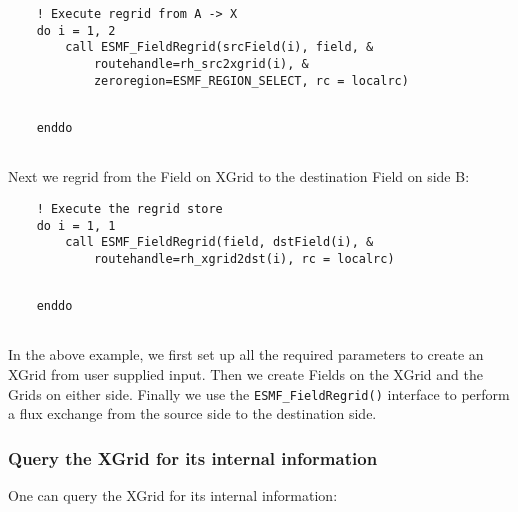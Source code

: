  \begin{verbatim}
    ! Execute regrid from A -> X
    do i = 1, 2
        call ESMF_FieldRegrid(srcField(i), field, &
            routehandle=rh_src2xgrid(i), &
            zeroregion=ESMF_REGION_SELECT, rc = localrc)
 
\end{verbatim}
 

 \begin{verbatim}
    enddo
 
\end{verbatim}
 

   Next we regrid from the Field on XGrid to the destination Field on side B: 

 \begin{verbatim}
    ! Execute the regrid store
    do i = 1, 1
        call ESMF_FieldRegrid(field, dstField(i), &
            routehandle=rh_xgrid2dst(i), rc = localrc)
 
\end{verbatim}
 

 \begin{verbatim}
    enddo
 
\end{verbatim}
 

   In the above example, we first set up all the required parameters to create an XGrid from user
   supplied input. Then we create Fields on the XGrid and the Grids on either side. Finally
   we use the {\tt ESMF\_FieldRegrid()} interface to perform a flux exchange from the source side
   to the destination side. 

  \subsubsection{Query the XGrid for its internal information}
  \label{sec:xgrid:usage:xgrid_get}
   One can query the XGrid for its internal information: 

